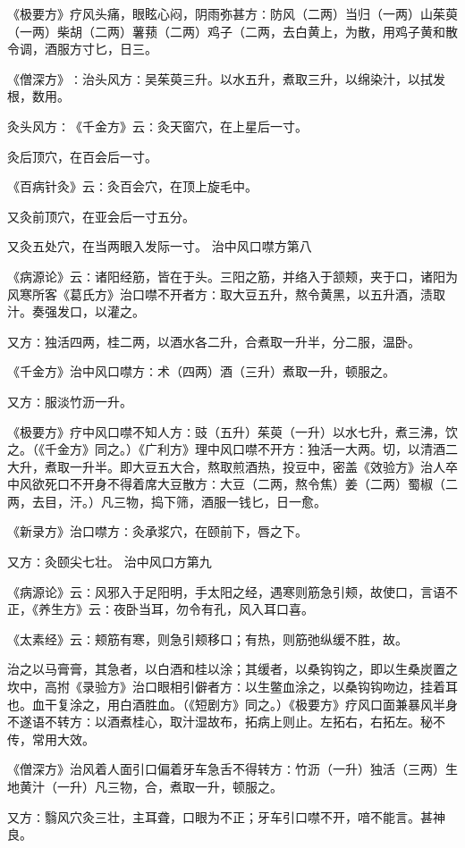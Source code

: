 \documentclass[a4paper,12pt,UTF8,twoside]{ctexbook}
\begin{document}
《极要方》疗风头痛，眼眩心闷，阴雨弥甚方∶防风（二两）当归（一两）山茱萸（一两）柴胡（二两）薯蓣（二两）鸡子（二两，去白黄上，为散，用鸡子黄和散令调，酒服方寸匕，日三。

《僧深方》∶治头风方∶吴茱萸三升。以水五升，煮取三升，以绵染汁，以拭发根，数用。

灸头风方∶《千金方》云∶灸天窗穴，在上星后一寸。

灸后顶穴，在百会后一寸。

《百病针灸》云∶灸百会穴，在顶上旋毛中。

又灸前顶穴，在亚会后一寸五分。

又灸五处穴，在当两眼入发际一寸。
治中风口噤方第八

《病源论》云∶诸阳经筋，皆在于头。三阳之筋，并络入于颔颊，夹于口，诸阳为风寒所客《葛氏方》治口噤不开者方∶取大豆五升，熬令黄黑，以五升酒，渍取汁。奏强发口，以灌之。

又方∶独活四两，桂二两，以酒水各二升，合煮取一升半，分二服，温卧。

《千金方》治中风口噤方∶术（四两）酒（三升）煮取一升，顿服之。

又方∶服淡竹沥一升。

《极要方》疗中风口噤不知人方∶豉（五升）茱萸（一升）以水七升，煮三沸，饮之。（《千金方》同之。）《广利方》理中风口噤不开方∶独活一大两。切，以清酒二大升，煮取一升半。即大豆五大合，熬取煎酒热，投豆中，密盖《效验方》治人卒中风欲死口不开身不得着席大豆散方∶大豆（二两，熬令焦）姜（二两）蜀椒（二两，去目，汗。）凡三物，捣下筛，酒服一钱匕，日一愈。

《新录方》治口噤方∶灸承浆穴，在颐前下，唇之下。

又方∶灸颐尖七壮。
治中风口方第九

《病源论》云∶风邪入于足阳明，手太阳之经，遇寒则筋急引颊，故使口，言语不正，《养生方》云∶夜卧当耳，勿令有孔，风入耳口喜。

《太素经》云∶颊筋有寒，则急引颊移口；有热，则筋弛纵缓不胜，故。

治之以马膏膏，其急者，以白酒和桂以涂；其缓者，以桑钩钩之，即以生桑炭置之坎中，高拊《录验方》治口眼相引僻者方∶以生鳖血涂之，以桑钩钩吻边，挂着耳也。血干复涂之，用白酒胜血。（《短剧方》同之。）《极要方》疗风口面兼暴风半身不遂语不转方∶以酒煮桂心，取汁湿故布，拓病上则止。左拓右，右拓左。秘不传，常用大效。

《僧深方》治风着人面引口偏着牙车急舌不得转方∶竹沥（一升）独活（三两）生地黄汁（一升）凡三物，合，煮取一升，顿服之。

又方∶翳风穴灸三壮，主耳聋，口眼为不正；牙车引口噤不开，喑不能言。甚神良。
\end{document}
